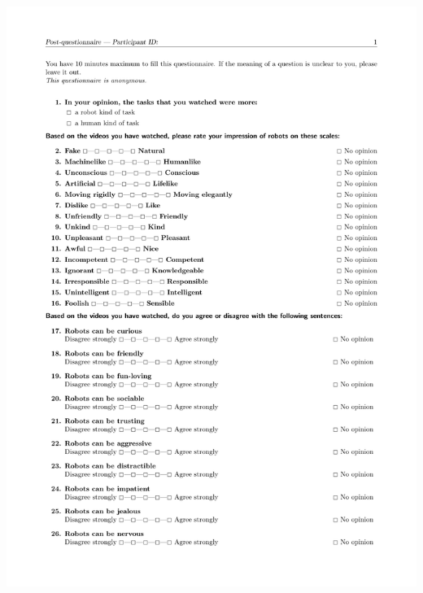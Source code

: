 \documentclass[lettersize, noapacite, twoside, HRI]{apa_HRI}
\begin{document}
\begin{center}
    \includegraphics[width=0.9\linewidth, page=2]{post-questionnaire}
\end{center}
%
%
\end{document}
